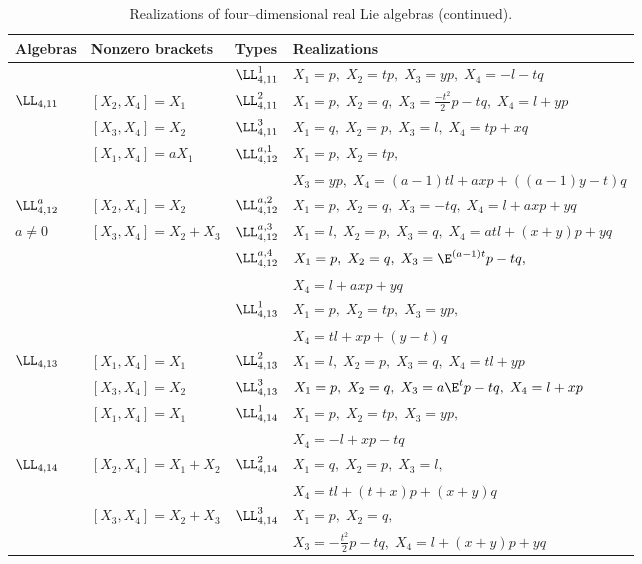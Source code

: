 \setcounter{table}{1}
\begin{table}
\label{t6}
\caption{Realizations of four--dimensional real Lie algebras (continued).}
\begin{center}
\begin{tabular}{|l|l|l|l|}
\hline
Algebras & Nonzero brackets & Types & Realizations\\
\hline
 & & $\LL_{4,11}^1 $ & $X_1=p,\;X_2=tp,\;X_3=yp,\;X_4=-l-tq$\\
\cline{3-4}
$\LL_{4,11}$ & $[X_2,X_4]=X_1$ & $\LL_{4,11}^2$ & $ X_1=p,\;X_2=q,\;
 X_3=\displaystyle{\frac{-t^2}{2}}p-tq,\;X_4=l+yp$\\
\cline{3-4}
 & $[X_3,X_4]=X_2$ & $\LL_{4,11}^3$ & $X_1=q,\;X_2=p,\;X_3=l,\;X_4=tp+xq$\\ 
\hline 
  & $[X_1,X_4]=aX_1$ & $\LL_{4,12}^{a,1}$ & $X_1=p,\;X_2=tp,$\\
  &  &  & $ X_3=yp,\;X_4=(a-1)tl+axp+((a-1)y-t)q$\\
\cline{3-4}
$\LL_{4,12}^a$ & $[X_2,X_4]=X_2$ & $\LL_{4,12}^{a,2}$ & $X_1=p,\;X_2=q,\; 
                                    X_3=-tq,\;X_4=l+axp+yq$\\ 
\cline{3-4} 
$a\ne 0$ & $[X_3,X_4]=X_2+X_3$ & $\LL_{4,12}^{a,3}$  & $X_1=l,\;X_2=p,\;    
 X_3=q,\;X_4=atl+(x+y)p+yq$\\
 \cline{3-4}
&  & $\LL_{4,12}^{a,4}$ &$X_1=p,\;X_2=q,\;X_3=\E^{(a-1)t}p-tq,$\\
&  &   & $X_4=l+axp+yq$\\ 
\hline
 &  & $\LL_{4,13}^1$ & $X_1=p,\;X_2=tp,\;X_3=yp,$\\
 &  &   &              $ X_4=tl+xp+(y-t)q$\\
\cline{3-4}
$\LL_{4,13}$ & $[X_1,X_4]=X_1$ & $\LL_{4,13}^2$ & $X_1=l,\;X_2=p,\;  
                              X_3=q,\;X_4=tl+yp$\\  
\cline{3-4}                              
 & $[X_3,X_4]=X_2$ & $\LL_{4,13}^3$ & $X_1=p,\;X_2=q,\;X_3=a\E^tp-tq,\;
                                     X_4=l+xp$\\
\hline
 & $[X_1,X_4]=X_1$ & $\LL_{4,14}^1$ & $X_1=p,\;X_2=tp,\;X_3=yp,$\\
 &    &    &                          $ X_4=-l+xp-tq$\\
\cline{3-4}
$\LL_{4,14}$ & $[X_2,X_4]=X_1+X_2$ & $\LL_{4,14}^2$ & $X_1=q,\;X_2=p,\;X_3=l,$\\
 &  &  &                            $ X_4=tl+(t+x)p+(x+y)q$\\
\cline{3-4}
 & $[X_3,X_4]=X_2+X_3$ & $\LL_{4,14}^3$ & $X_1=p,\;X_2=q,$\\
 &  &  &       $ X_3=-\displaystyle{\frac{t^2}{2}}p-tq,\; X_4=l+(x+y)p+yq$\\
\hline
\end{tabular}
\end{center}
\end{table}
